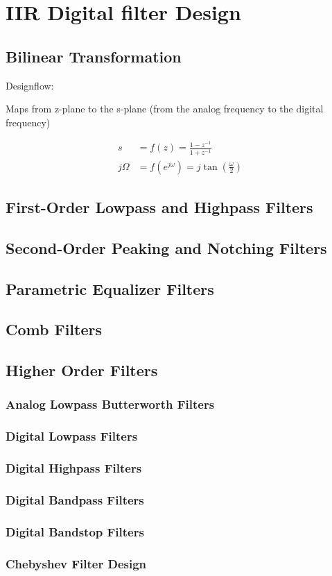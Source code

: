 \section{IIR Digital filter Design}
\subsection{Bilinear Transformation}
Designflow:
\begin{center}

\end{center}
Maps from z-plane to the s-plane (from the analog frequency to the digital
frequency)

\begin{align*}
s 		&= f(z) = \frac{1-z^{-1}}{1+z^{-1}}\\
j\Omega &= f(e^{j\omega}) = j \tan \left( \frac{\omega}{2} \right)
\end{align*}

\subsection{First-Order Lowpass and Highpass Filters}
\subsection{Second-Order Peaking and Notching Filters}
\subsection{Parametric Equalizer Filters}
\subsection{Comb Filters}

\subsection{Higher Order Filters}
\subsubsection{Analog Lowpass Butterworth Filters}
\subsubsection{Digital Lowpass Filters}
\subsubsection{Digital Highpass Filters}
\subsubsection{Digital Bandpass Filters}
\subsubsection{Digital Bandstop Filters}
\subsubsection{Chebyshev Filter Design}
